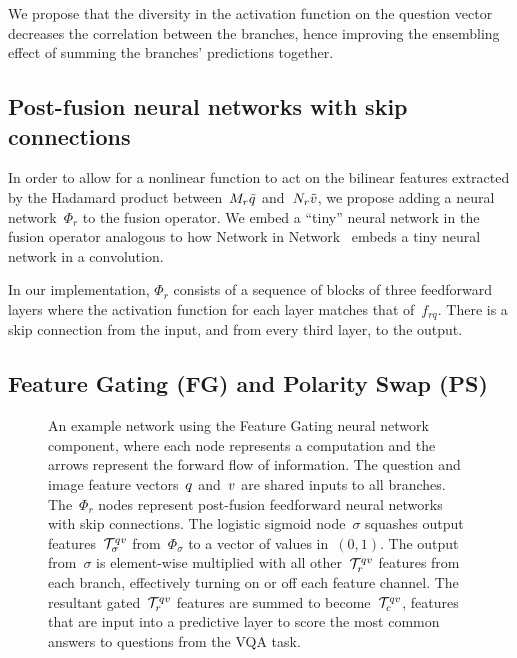 We propose that the diversity in the activation function on the question vector
decreases the correlation between the branches, hence improving the ensembling
effect of summing the branches' predictions together.


\subsection{Post-fusion neural networks with skip connections}

In order to allow for a nonlinear function to act on the bilinear features
extracted by the Hadamard product between~$M_r\tilde{q}$
and~$N_r\tilde{v}$, we propose adding a neural network~$\Phi_r$ to the
fusion operator. We embed a ``tiny'' neural network in the fusion operator
analogous to how Network in Network~\citep{lin2013network} embeds a tiny neural
network in a convolution.

In our implementation, $\Phi_r$ consists of a sequence of blocks of three
feedforward layers where the activation function for each layer matches that
of~$f_{rq}$.  There is a skip connection from the input, and from every third
layer, to the output.


\subsection{Feature Gating (FG) and Polarity Swap (PS)}

\begin{figure*}[!t]
\centering

\caption{An example network using the Feature Gating neural
         network component, where each node represents a computation and
         the arrows represent the forward flow of information. The question and
         image feature vectors~$q$ and~$v$ are shared inputs to all branches.
         The~$\Phi_r$ nodes represent post-fusion feedforward neural networks
         with skip connections. The logistic sigmoid node~$\sigma$ squashes
         output features~$\mathcal{T}_\sigma^{q{}v{}}$ from~$\Phi_\sigma$ to a vector
         of values in~$(0, 1)$. The output from~$\sigma$ is element-wise
         multiplied with all other~$\mathcal{T}_r^{q{}v{}}$ features from each branch,
         effectively turning on or off each feature channel. The resultant
         gated~$\mathcal{T}_r^{q{}v{}}$ features are summed to become~$\mathcal{T}_c^{q{}v{}}$,
         features that are input into a predictive layer to score the most
         common answers to questions from the VQA task.}
\label{fig:feature-gating}
\end{figure*}

